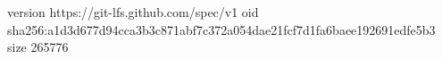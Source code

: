 version https://git-lfs.github.com/spec/v1
oid sha256:a1d3d677d94cca3b3c871abf7c372a054dae21fcf7d1fa6baee192691edfe5b3
size 265776

